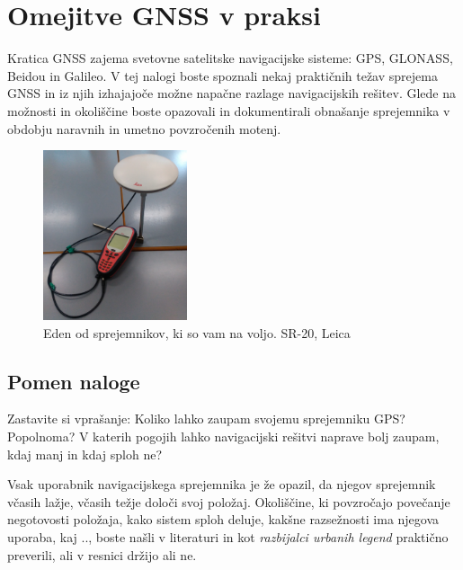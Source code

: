 %
\chapter{Omejitve GNSS v praksi}
\label{Vaje:GnssPraks} %

Kratica GNSS zajema svetovne satelitske navigacijske sisteme: GPS, GLONASS, Beidou in Galileo. V tej nalogi boste spoznali nekaj praktičnih težav sprejema GNSS in iz njih izhajajoče možne napačne razlage navigacijskih rešitev. Glede na možnosti in okoliščine boste opazovali in dokumentirali obnašanje sprejemnika v obdobju naravnih in umetno povzročenih motenj.

\begin{figure}
	\centering
	\includegraphics[height=5cm]{Vaje/OmejGnssPrak/figs/SR20-Leica.jpg}
	\caption{Eden od sprejemnikov, ki so vam na voljo. SR-20, Leica}%
	\label{fig:OmejGnss_60cs}
\end{figure}

\section{Pomen naloge}
\label{sec:GnnsPomen}

Zastavite si vprašanje: Koliko lahko zaupam svojemu sprejemniku GPS? Popolnoma? V katerih pogojih lahko navigacijski rešitvi naprave bolj zaupam, kdaj manj in kdaj sploh ne?

Vsak uporabnik navigacijskega sprejemnika je že opazil, da njegov sprejemnik včasih lažje, včasih težje določi svoj položaj. Okoliščine, ki povzročajo povečanje negotovosti položaja, kako sistem sploh deluje, kakšne razsežnosti ima njegova uporaba, kaj .., boste našli v literaturi in kot \textit{razbijalci urbanih legend} praktično preverili, ali v resnici držijo ali ne.  

